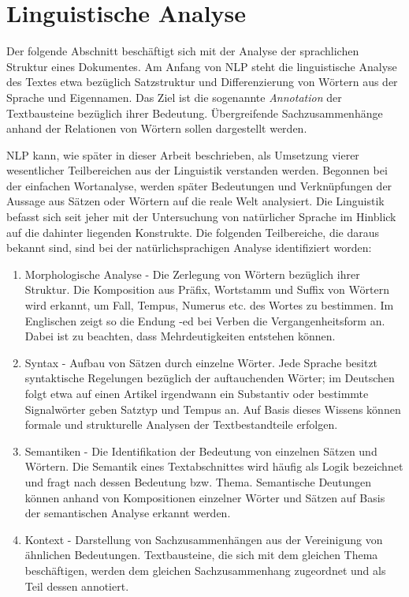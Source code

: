 \documentclass[12pt]{report}
\begin{document}
\section{Linguistische Analyse}
Der folgende Abschnitt beschäftigt sich mit der Analyse der sprachlichen Struktur eines Dokumentes. Am Anfang von NLP steht die linguistische Analyse des Textes etwa bezüglich Satzstruktur und Differenzierung von Wörtern aus der Sprache und Eigennamen. Das Ziel ist die sogenannte \textit{Annotation} der Textbausteine bezüglich ihrer Bedeutung. Übergreifende Sachzusammenhänge anhand der Relationen von Wörtern sollen dargestellt werden.

NLP kann, wie später in dieser Arbeit beschrieben, als Umsetzung vierer wesentlicher Teilbereichen aus der Linguistik verstanden werden. Begonnen bei der einfachen Wortanalyse, werden später Bedeutungen und Verknüpfungen der Aussage aus Sätzen oder Wörtern auf die reale Welt analysiert. Die Linguistik befasst sich seit jeher mit der Untersuchung von natürlicher Sprache im Hinblick auf die dahinter liegenden Konstrukte. Die folgenden Teilbereiche, die daraus bekannt sind, sind bei der natürlichsprachigen Analyse identifiziert worden:

\begin{enumerate}
\item
Morphologische Analyse - Die Zerlegung von Wörtern bezüglich ihrer Struktur. Die Komposition aus Präfix, Wortstamm und Suffix von Wörtern wird erkannt, um Fall, Tempus, Numerus etc. des Wortes zu bestimmen. Im Englischen zeigt so die Endung -ed bei Verben die Vergangenheitsform an. Dabei ist zu beachten, dass Mehrdeutigkeiten entstehen können.
\item
Syntax - Aufbau von Sätzen durch einzelne Wörter. Jede Sprache besitzt syntaktische Regelungen bezüglich der auftauchenden Wörter; im Deutschen folgt etwa auf einen Artikel irgendwann ein Substantiv oder bestimmte Signalwörter geben Satztyp und Tempus an. Auf Basis dieses Wissens können formale und strukturelle Analysen der Textbestandteile erfolgen.
\item
Semantiken - Die Identifikation der Bedeutung von einzelnen Sätzen und Wörtern. Die Semantik eines Textabschnittes wird häufig als \glqq  Logik\grqq{} bezeichnet und fragt nach dessen Bedeutung bzw. Thema. Semantische Deutungen können anhand von Kompositionen einzelner Wörter und Sätzen auf Basis der semantischen Analyse erkannt werden.
\item
Kontext - Darstellung von Sachzusammenhängen aus der Vereinigung von ähnlichen Bedeutungen. Textbausteine, die sich mit dem gleichen Thema beschäftigen, werden dem gleichen Sachzusammenhang zugeordnet und als Teil dessen annotiert.
\end{enumerate}
\end{document}
